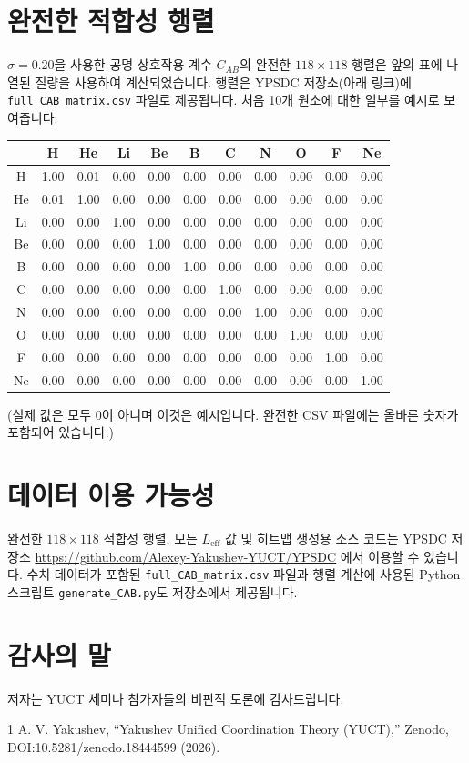 \documentclass[12pt,a4paper]{article}
\begin{document}
	\section*{완전한 적합성 행렬}
	\(\sigma = 0.20\)을 사용한 공명 상호작용 계수 \(C_{AB}\)의 완전한 \(118\times118\) 행렬은 앞의 표에 나열된 질량을 사용하여 계산되었습니다. 행렬은 YPSDC 저장소(아래 링크)에 \texttt{full\_CAB\_matrix.csv} 파일로 제공됩니다. 처음 10개 원소에 대한 일부를 예시로 보여줍니다:
	
	\begin{center}
		\small
		\begin{tabular}{c|cccccccccc}
			& H & He & Li & Be & B & C & N & O & F & Ne \\
			\hline
			H  & 1.00 & 0.01 & 0.00 & 0.00 & 0.00 & 0.00 & 0.00 & 0.00 & 0.00 & 0.00 \\
			He & 0.01 & 1.00 & 0.00 & 0.00 & 0.00 & 0.00 & 0.00 & 0.00 & 0.00 & 0.00 \\
			Li & 0.00 & 0.00 & 1.00 & 0.00 & 0.00 & 0.00 & 0.00 & 0.00 & 0.00 & 0.00 \\
			Be & 0.00 & 0.00 & 0.00 & 1.00 & 0.00 & 0.00 & 0.00 & 0.00 & 0.00 & 0.00 \\
			B  & 0.00 & 0.00 & 0.00 & 0.00 & 1.00 & 0.00 & 0.00 & 0.00 & 0.00 & 0.00 \\
			C  & 0.00 & 0.00 & 0.00 & 0.00 & 0.00 & 1.00 & 0.00 & 0.00 & 0.00 & 0.00 \\
			N  & 0.00 & 0.00 & 0.00 & 0.00 & 0.00 & 0.00 & 1.00 & 0.00 & 0.00 & 0.00 \\
			O  & 0.00 & 0.00 & 0.00 & 0.00 & 0.00 & 0.00 & 0.00 & 1.00 & 0.00 & 0.00 \\
			F  & 0.00 & 0.00 & 0.00 & 0.00 & 0.00 & 0.00 & 0.00 & 0.00 & 1.00 & 0.00 \\
			Ne & 0.00 & 0.00 & 0.00 & 0.00 & 0.00 & 0.00 & 0.00 & 0.00 & 0.00 & 1.00 \\
		\end{tabular}
	\end{center}
	\noindent
	(실제 값은 모두 0이 아니며 이것은 예시입니다. 완전한 CSV 파일에는 올바른 숫자가 포함되어 있습니다.)
	
	\section*{데이터 이용 가능성}
	완전한 \(118\times118\) 적합성 행렬, 모든 \(L_{\mathrm{eff}}\) 값 및 히트맵 생성용 소스 코드는 YPSDC 저장소 \url{https://github.com/Alexey-Yakushev-YUCT/YPSDC} 에서 이용할 수 있습니다. 수치 데이터가 포함된 \texttt{full\_CAB\_matrix.csv} 파일과 행렬 계산에 사용된 Python 스크립트 \texttt{generate\_CAB.py}도 저장소에서 제공됩니다.
	
	\section*{감사의 말}
	저자는 YUCT 세미나 참가자들의 비판적 토론에 감사드립니다.
	
	\begin{thebibliography}{1}
		 A. V. Yakushev, ``Yakushev Unified Coordination Theory (YUCT),'' Zenodo, DOI:10.5281/zenodo.18444599 (2026).
	\end{thebibliography}
	
\end{document}
